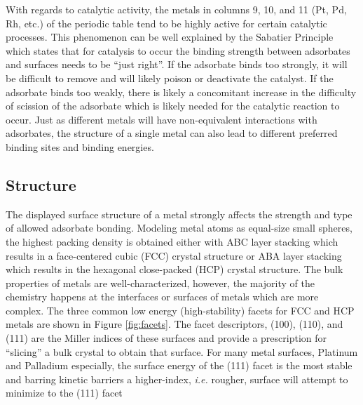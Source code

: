 With regards to catalytic activity, the metals in columns 9, 10, and 11 (Pt,
Pd, Rh, etc.) of the periodic table tend to be highly active for certain
catalytic processes. This phenomenon can be well explained by the Sabatier
Principle which states that for catalysis to occur the binding strength between
adsorbates and surfaces needs to be ``just right''. If the adsorbate binds too
strongly, it will be difficult to remove and will likely poison or deactivate
the catalyst. If the adsorbate binds too weakly, there is likely a concomitant
increase in the difficulty of scission of the adsorbate which is likely needed
for the catalytic reaction to occur. Just as different metals will have
non-equivalent interactions with adsorbates, the structure of a single metal
can also lead to different preferred binding sites and binding energies.


\subsection{Structure}
The displayed surface structure of a metal strongly affects the strength and
type of allowed adsorbate bonding.  Modeling metal atoms as equal-size small
spheres, the highest packing density is obtained either with ABC layer stacking
which results in a face-centered cubic (FCC) crystal structure or ABA layer
stacking which results in the hexagonal close-packed (HCP) crystal structure.
The bulk properties of metals are well-characterized, however, the majority of
the chemistry happens at the interfaces or surfaces of metals which are more
complex. The three common low energy (high-stability) facets for FCC and HCP
metals are shown in Figure \ref{fig:facets}. The facet descriptors, (100),
(110), and (111) are the Miller indices of these surfaces and provide a
prescription for ``slicing'' a bulk crystal to obtain that surface. For many
metal surfaces, Platinum and Palladium especially, the surface energy of the
(111) facet is the most stable and barring kinetic barriers a higher-index,
{\em i.e.} rougher, surface will attempt to minimize to the (111) facet


